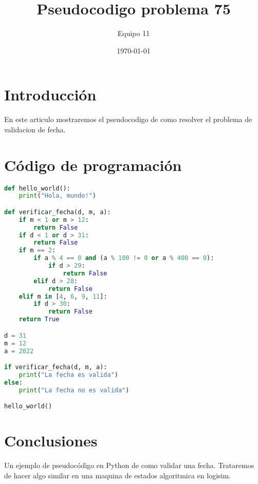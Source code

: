 \documentclass{article}
\begin{document}
\title{Pseudocodigo problema 75}
\author{Equipo 11}
\date{\today}

\maketitle

\section{Introducción}
En este articulo mostraremos el pseudocodigo de como resolver el problema de validacion de fecha.


\section{Código de programación}


\begin{lstlisting}[language=Python]
def hello_world():
	print("Hola, mundo!")

def verificar_fecha(d, m, a):
	if m < 1 or m > 12:
		return False
	if d < 1 or d > 31:
		return False
	if m == 2:
		if a % 4 == 0 and (a % 100 != 0 or a % 400 == 0):
			if d > 29:
				return False
		elif d > 28:
			return False
	elif m in [4, 6, 9, 11]:
		if d > 30:
			return False
	return True

d = 31
m = 12
a = 2022

if verificar_fecha(d, m, a):
	print("La fecha es valida")
else:
	print("La fecha no es valida")

hello_world()
\end{lstlisting}

\section{Conclusiones}

Un ejemplo de pseudocódigo en Python de como validar una fecha. Trataremos de hacer algo similar en una maquina de estados algoritmica en logisim.
\end{document}

